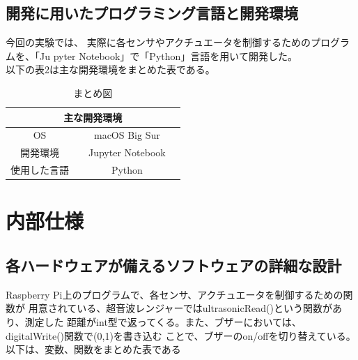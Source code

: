 \documentclass[dvipdfmx,autodetect-engine,titlepage]{jsarticle}
\begin{document}
 \subsection{開発に用いたプログラミング言語と開発環境}
 今回の実験では、 実際に各センサやアクチュエータを制御するためのプログラムを、「Ju
 pyter Notebook」で「Python」言語を用いて開発した。\\
 以下の表2は主な開発環境をまとめた表である。

 \begin{table}[h]
  \centering
  \caption{まとめ図}
  \begin{tabular}{clcl}
  \hline
  \multicolumn{4}{c}{主な開発環境}                          \\ \hline
  OS     &  & macOS Big Sur                        &  \\ \hline
  開発環境   &  & \multicolumn{1}{l}{Jupyter Notebook} &  \\ \hline
  使用した言語 &  & Python                               &  \\ \hline
  \end{tabular}
  \end{table}



\section{内部仕様}

  \subsection{各ハードウェアが備えるソフトウェアの詳細な設計}
  Raspberry Pi上のプログラムで、各センサ、アクチュエータを制御するための関数が
  用意されている、超音波レンジャーではultrasonicRead()という関数があり、測定した
  距離がint型で返ってくる。また、ブザーにおいては、digitalWrite()関数で(0,1)を書き込む
  ことで、ブザーのon/offを切り替えている。以下は、変数、関数をまとめた表である
\end{document}

